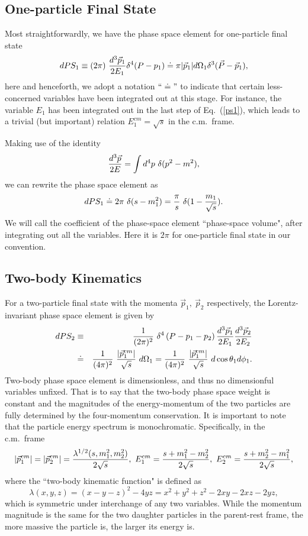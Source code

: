 \documentclass[12pt,prd,aps,floats,preprintnumbers,preprint,superscriptaddress,floatfix,nofootinbib]{revtex4}
\def\vp{{\vec p}}
\def\be{\begin{equation}}
\def\ee{\end{equation}}
\def\bea{\begin{eqnarray}}
\def\eea{\end{eqnarray}}
\begin{document}
\subsection{One-particle Final State}
\label{one-body}
Most straightforwardly, we have the phase space element for one-particle final state
\be
dPS_1\equiv (2\pi)\ {d^3\vec p_1\over 2E_1} \delta^4 (P-p_1) \doteq
\pi | \vec p_1| d\Omega_1 \delta^3 (\vec P-\vec p_1),
\label{ps1}
\ee
here and henceforth, we adopt a notation $``\doteq"$ to indicate that certain less-concerned
variables have been integrated out at this stage. For instance, the variable $E_1$ has
been integrated out in the last step of Eq.~(\ref{ps1}), which leads to a trivial (but
important) relation $E^{cm}_1=\sqrt s$ in the c.m.~frame. 

Making use of the identity
\be
{d^3\vec p\over 2E} = \int d^4p\  \delta(p^2-m^2), 
\ee
we can rewrite the phase space element as
\be
dPS_1\doteq 2\pi\  \delta(s-m_1^2)= {\pi \over s}\  \delta(1-{m_1\over \sqrt s}).
\ee
We will call the coefficient of the phase-space element  ``phase-space volume", 
after integrating out all the variables. 
Here it is $2\pi$ for one-particle final state in our convention.

\subsection{Two-body Kinematics}
\label{two-body}

For a two-particle final state with the momenta $\vp_1,\ \vp_2$ respectively, 
the Lorentz-invariant phase space element  is given by
\bea
\nonumber
dPS_2 &\equiv&  {1\over (2\pi)^2}\ 
\delta^4\left(P- p_1-p_2 \right) {d^3\vec p_1\over 2E_1}  {d^3\vec p_2\over 2E_2} \\
 &\doteq & {1\over (4\pi)^2}\  {|\vp_1^{cm}|\over \sqrt s} \ d\Omega_1 
 = {1\over (4\pi)^2}\  {|\vp_1^{cm}|\over \sqrt s}\  d\cos\theta_1 d\phi_1.
\label{ps2}
\eea
Two-body phase space element is dimensionless, and thus no dimensionful 
variables unfixed.  That is to say that the two-body phase space weight is 
constant and the magnitudes of 
the energy-momentum of the two particles are fully
determined by the four-momentum conservation. 
It is important to note that the particle energy spectrum is monochromatic. 
Specifically, in the c.m.~frame
\bea
|\vp_1^{cm}| = |\vp_2^{cm}|={\lambda^{1/2}(s,m_1^2,m_2^2)\over 2\sqrt s},\ 
E_1^{cm}={s+m_1^2-m_2^2\over 2\sqrt s} ,\ 
E_2^{cm}={s+m_2^2-m_1^2\over 2\sqrt s} ,
\nonumber
\eea
where the ``two-body kinematic function" is defined as
\be
\lambda(x,y,z)=(x-y-z)^2-4yz=x^2+y^2+z^2-2xy-2xz-2yz,
\ee
which is symmetric under interchange of any two variables.
While the momentum magnitude is the same for the two
daughter particles in the parent-rest frame, the more massive
the particle  is, the  larger its energy is.
\end{document}
